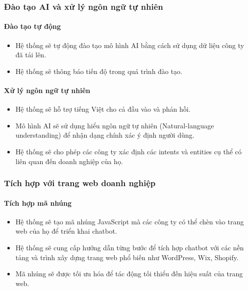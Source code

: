 \subsubsection{Đào tạo AI và xử lý ngôn ngữ tự nhiên}

\paragraph{Đào tạo tự động}
\begin{itemize}
    \item Hệ thống sẽ tự động đào tạo mô hình AI bằng cách sử dụng dữ liệu công ty đã tải lên.
    \item Hệ thống sẽ thông báo tiến độ trong quá trình đào tạo.
\end{itemize}

\paragraph{Xử lý ngôn ngữ tự nhiên}
\begin{itemize}
    \item Hệ thống sẽ hỗ trợ tiếng Việt cho cả đầu vào và phản hồi.
    \item Mô hình AI sẽ sử dụng hiểu ngôn ngữ tự nhiên (Natural-language understanding) để nhận dạng chính xác ý định người dùng.
    \item Hệ thống sẽ cho phép các công ty xác định các intents và entities cụ thể có liên quan đến doanh nghiệp của họ.
\end{itemize}

\subsubsection{Tích hợp với trang web doanh nghiệp}

\paragraph{Tích hợp mã nhúng}
\begin{itemize}
    \item Hệ thống sẽ tạo mã nhúng JavaScript mà các công ty có thể chèn vào trang web của họ để triển khai chatbot.
    \item Hệ thống sẽ cung cấp hướng dẫn từng bước để tích hợp chatbot với các nền tảng và trình xây dựng trang web phổ biến như WordPress, Wix, Shopify.
    \item Mã nhúng sẽ được tối ưu hóa để tác động tối thiểu đến hiệu suất của trang web.
\end{itemize}

